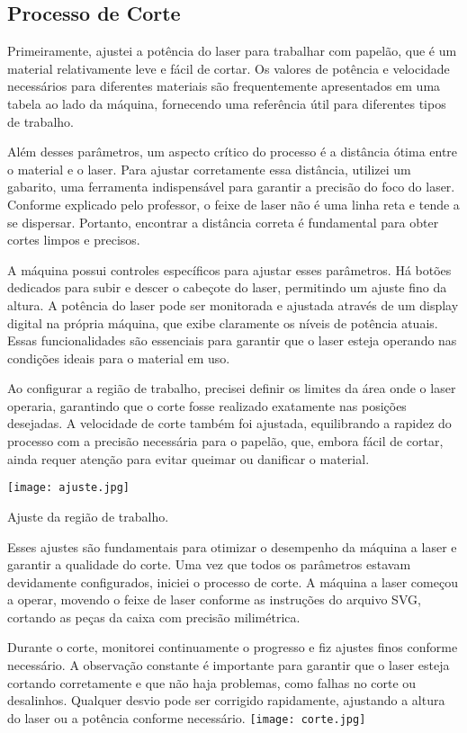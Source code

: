 \documentclass[
]{book}
\begin{document}
\subsection{Processo de Corte}\label{processo-de-corte}

Primeiramente, ajustei a potência do laser para trabalhar com papelão, que é um material relativamente leve e fácil de cortar. Os valores de potência e velocidade necessários para diferentes materiais são frequentemente apresentados em uma tabela ao lado da máquina, fornecendo uma referência útil para diferentes tipos de trabalho.

Além desses parâmetros, um aspecto crítico do processo é a distância ótima entre o material e o laser. Para ajustar corretamente essa distância, utilizei um gabarito, uma ferramenta indispensável para garantir a precisão do foco do laser. Conforme explicado pelo professor, o feixe de laser não é uma linha reta e tende a se dispersar. Portanto, encontrar a distância correta é fundamental para obter cortes limpos e precisos.

A máquina possui controles específicos para ajustar esses parâmetros. Há botões dedicados para subir e descer o cabeçote do laser, permitindo um ajuste fino da altura. A potência do laser pode ser monitorada e ajustada através de um display digital na própria máquina, que exibe claramente os níveis de potência atuais. Essas funcionalidades são essenciais para garantir que o laser esteja operando nas condições ideais para o material em uso.

Ao configurar a região de trabalho, precisei definir os limites da área onde o laser operaria, garantindo que o corte fosse realizado exatamente nas posições desejadas. A velocidade de corte também foi ajustada, equilibrando a rapidez do processo com a precisão necessária para o papelão, que, embora fácil de cortar, ainda requer atenção para evitar queimar ou danificar o material.

\texttt{[image: ajuste.jpg]}

Ajuste da região de trabalho.

Esses ajustes são fundamentais para otimizar o desempenho da máquina a laser e garantir a qualidade do corte. Uma vez que todos os parâmetros estavam devidamente configurados, iniciei o processo de corte. A máquina a laser começou a operar, movendo o feixe de laser conforme as instruções do arquivo SVG, cortando as peças da caixa com precisão milimétrica.

Durante o corte, monitorei continuamente o progresso e fiz ajustes finos conforme necessário. A observação constante é importante para garantir que o laser esteja cortando corretamente e que não haja problemas, como falhas no corte ou desalinhos. Qualquer desvio pode ser corrigido rapidamente, ajustando a altura do laser ou a potência conforme necessário.
\texttt{[image: corte.jpg]}
\end{document}
